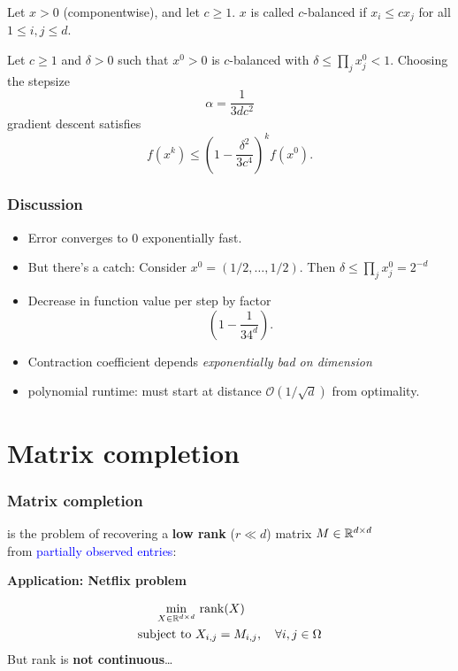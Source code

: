 \documentclass[aspectratio=149]{beamer}
\DeclareMathOperator*{\rank}{rank}
\begin{document}
\begin{frame}
  \frametitle{}
  \begin{definition}
    Let $x > 0$ (componentwise), and let $c \ge 1$. $x$ is called $c$-balanced if $x_i \le cx_j$ for all $1 \le i, j \le d$.
  \end{definition}

  \begin{theorem}
    Let $c\ge 1$ and $\delta> 0$ such that $x^0 > 0$ is $c$-balanced with $\delta \le \prod_j x^0_j < 1$. Choosing the stepsize
    \begin{equation}
      \alpha = \frac{1}{3d c^2}
    \end{equation}
    gradient descent satisfies
    \begin{equation}
      f(x^k) \le {\left( 1- \frac{\delta^2}{3 c^4} \right)}^k f(x^0).
    \end{equation}
  \end{theorem}
\end{frame}


\begin{frame}
  \frametitle{Discussion}

  \begin{itemize}
    \item Error converges to 0 exponentially fast.
    \item But there's a catch: Consider $x^0 = (1/2, \dots, 1/2)$. Then $\delta \le \prod_j x^0_j = 2^{-d}$
    \item Decrease in function value per step by factor
          \begin{equation}
            \left( 1- \frac{1}{3 4^d} \right).
          \end{equation}
    \item Contraction coefficient depends \textit{exponentially bad on dimension}
    \item polynomial runtime: must start at distance $\mathcal{O}(1/\sqrt{d})$ from optimality.
  \end{itemize}
\end{frame}


\section{Matrix completion}%
\label{sec:}

\begin{frame}
  \frametitle{Matrix completion}

  is the problem of recovering a \textbf{low rank} ($r \ll d$) matrix $M \in \mathbb{R}^{d\times d}$ \\
  from \textcolor{blue}{partially observed entries}:
  \begin{block}{}
    \textbf{Application: Netflix problem}
  \end{block}
  \begin{align}
    \min_{X\in \R^{d\times d}} &\, \rank(X) \\
    \text{subject to } & X_{i,j} = M_{i,j}, \quad \forall i,j \in \Omega
  \end{align}
  But rank is \textbf{not continuous}\ldots
\end{frame}
\end{document}

